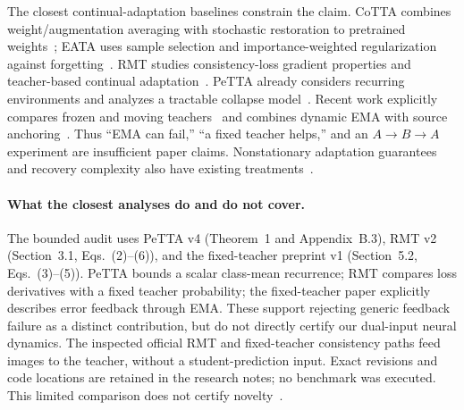 \documentclass[11pt,a4paper]{article}
\begin{document}
The closest continual-adaptation baselines constrain the claim. CoTTA
combines weight/augmentation averaging with stochastic restoration to
pretrained weights~\cite{cotta}; EATA uses sample selection and
importance-weighted regularization against forgetting~\cite{eata}.
RMT studies consistency-loss gradient properties and teacher-based
continual adaptation~\cite{rmt}. PeTTA already considers recurring
environments and analyzes a tractable collapse model~\cite{petta}.
Recent work explicitly compares frozen and moving teachers~\cite{fixedteacher}
and combines dynamic EMA with source anchoring~\cite{desa}. Thus ``EMA can
fail,'' ``a fixed teacher helps,'' and an $A\to B\to A$ experiment are
insufficient paper claims. Nonstationary adaptation guarantees and recovery
complexity also have existing treatments~\cite{realign,recovery}.

\paragraph{What the closest analyses do and do not cover.}
The bounded audit uses PeTTA v4 (Theorem~1 and Appendix~B.3), RMT v2
(Section~3.1, Eqs.~(2)--(6)), and the fixed-teacher preprint v1
(Section~5.2, Eqs.~(3)--(5)). PeTTA bounds a scalar class-mean recurrence;
RMT compares loss derivatives with a fixed teacher probability;
the fixed-teacher paper explicitly describes error feedback through EMA.
These support rejecting generic feedback failure as a distinct contribution,
but do not directly certify our dual-input neural dynamics.
The inspected official RMT and fixed-teacher consistency paths feed images
to the teacher, without a student-prediction input. Exact revisions and code
locations are retained in the research notes; no benchmark was executed.
This limited comparison does not certify novelty~\cite{petta,rmt,fixedteacher}.
\end{document}
